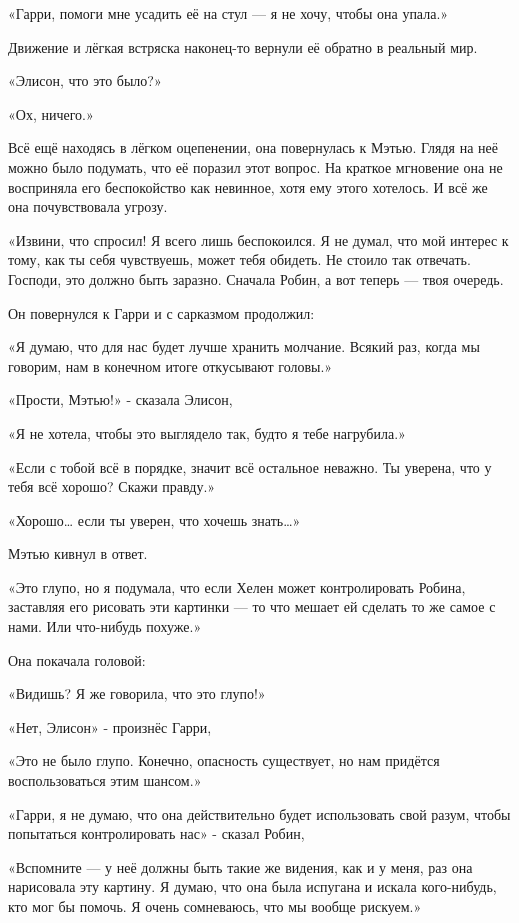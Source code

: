 \documentclass[a4paper,12pt]{book}
\begin{document}
\par
«Гарри, помоги мне усадить её на стул — я не хочу, чтобы она упала.»
\par
Движение и лёгкая встряска наконец-то вернули её обратно в реальный мир.
\par
«Элисон, что это было?»
\par
«Ох, ничего.»
\par
Всё ещё находясь в лёгком оцепенении, она повернулась к Мэтью. Глядя на неё можно было подумать, что её поразил этот вопрос. На краткое мгновение она не восприняла его беспокойство как невинное, хотя ему этого хотелось. И всё же она почувствовала угрозу.
\par
«Извини, что спросил! Я всего лишь беспокоился. Я не думал, что мой интерес к тому, как ты себя чувствуешь, может тебя обидеть. Не стоило так отвечать. Господи, это должно быть заразно. Сначала Робин, а вот теперь — твоя очередь.
\par
Он повернулся к Гарри и с сарказмом продолжил:
\par
«Я думаю, что для нас будет лучше хранить молчание. Всякий раз, когда мы говорим, нам в конечном итоге откусывают головы.»
\par
«Прости, Мэтью!» - сказала Элисон,
\par
«Я не хотела, чтобы это выглядело так, будто я тебе нагрубила.»
\par
«Если с тобой всё в порядке, значит всё остальное неважно. Ты уверена, что у тебя всё хорошо? Скажи правду.»
\par
«Хорошо… если ты уверен, что хочешь знать…»
\par
Мэтью кивнул в ответ.
\par
«Это глупо, но я подумала, что если Хелен может контролировать Робина, заставляя его рисовать эти картинки — то что мешает ей сделать то же самое с нами. Или что-нибудь похуже.»
\par
Она покачала головой:
\par
«Видишь? Я же говорила, что это глупо!»
\par
«Нет, Элисон» - произнёс Гарри,
\par
«Это не было глупо. Конечно, опасность существует, но нам придётся воспользоваться этим шансом.»
\par
«Гарри, я не думаю, что она действительно будет использовать свой разум, чтобы попытаться контролировать нас» - сказал Робин,
\par
«Вспомните — у неё должны быть такие же видения, как и у меня, раз она нарисовала эту картину. Я думаю, что она была испугана и искала кого-нибудь, кто мог бы помочь. Я очень сомневаюсь, что мы вообще рискуем.»
\end{document}
